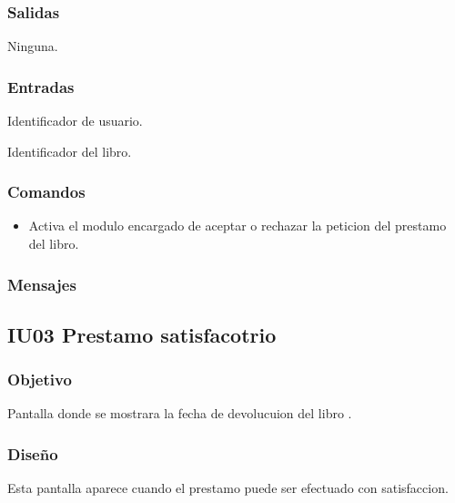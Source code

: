 
\subsubsection{Salidas}
	\begin{Citemize}
		\item Ninguna. 
	\end{Citemize}
	
\subsubsection{Entradas}
	\begin{Citemize}
		\item Identificador de usuario.
		\item Identificador del libro.
	\end{Citemize}

\subsubsection{Comandos}
\begin{itemize}
	\item  {} Activa el modulo encargado de aceptar o rechazar la peticion del prestamo del libro.
\end{itemize}

\subsubsection{Mensajes}
	\begin{Citemize}
		\item {\bf  {} }
	\end{Citemize}

\newpage
\subsection{IU03 Prestamo satisfacotrio}

\subsubsection{Objetivo}
	Pantalla donde se mostrara la fecha de devolucuion del libro .

\subsubsection{Diseño}
	Esta pantalla aparece cuando el prestamo puede ser efectuado con satisfaccion.

